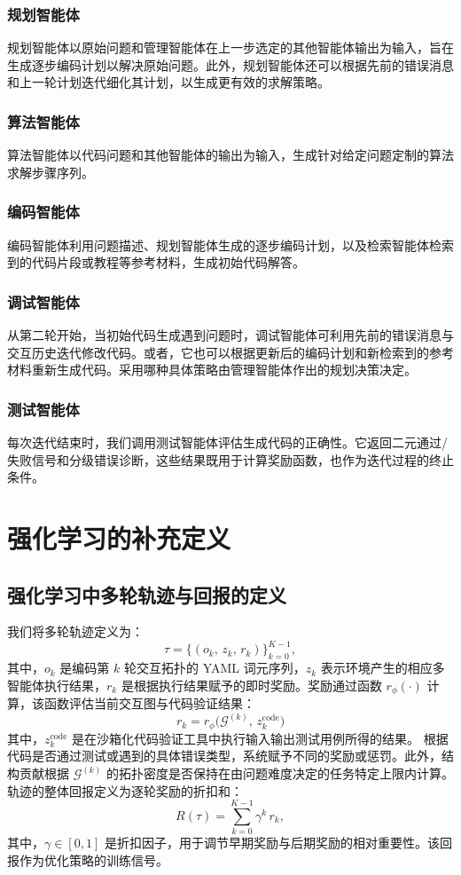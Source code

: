 \documentclass{article}
\theoremstyle{definition}
\begin{document}
\subsubsection{规划智能体}
规划智能体以原始问题和管理智能体在上一步选定的其他智能体输出为输入，旨在生成逐步编码计划以解决原始问题。此外，规划智能体还可以根据先前的错误消息和上一轮计划迭代细化其计划，以生成更有效的求解策略。
\subsubsection{算法智能体}
算法智能体以代码问题和其他智能体的输出为输入，生成针对给定问题定制的算法求解步骤序列。
\subsubsection{编码智能体}
编码智能体利用问题描述、规划智能体生成的逐步编码计划，以及检索智能体检索到的代码片段或教程等参考材料，生成初始代码解答。
\subsubsection{调试智能体}
从第二轮开始，当初始代码生成遇到问题时，调试智能体可利用先前的错误消息与交互历史迭代修改代码。或者，它也可以根据更新后的编码计划和新检索到的参考材料重新生成代码。采用哪种具体策略由管理智能体作出的规划决策决定。
\subsubsection{测试智能体}
每次迭代结束时，我们调用测试智能体评估生成代码的正确性。它返回二元通过/失败信号和分级错误诊断，这些结果既用于计算奖励函数，也作为迭代过程的终止条件。
\section{强化学习的补充定义}
\subsection{强化学习中多轮轨迹与回报的定义}
\label{appendix:Multi-Turn Trajectories}
我们将多轮轨迹定义为：
\begin{equation}\label{eq:traj}
\tau = \{(o_k,\, z_k,\, r_k)\}_{k=0}^{K-1},
\end{equation}
其中，$o_k$ 是编码第 $k$ 轮交互拓扑的 YAML 词元序列，$z_k$ 表示环境产生的相应多智能体执行结果，$r_k$ 是根据执行结果赋予的即时奖励。奖励通过函数 \(r_\phi(\cdot)\) 计算，该函数评估当前交互图与代码验证结果：
\begin{equation}\label{eq:reward}
r_k = r_\phi\!\big(\mathcal{G}^{(k)},\, z_k^{\text{code}}\big)
\end{equation}
其中，\(z_k^{\text{code}}\) 是在沙箱化代码验证工具中执行输入输出测试用例所得的结果。
根据代码是否通过测试或遇到的具体错误类型，系统赋予不同的奖励或惩罚。此外，结构贡献根据 $\mathcal{G}^{(k)}$ 的拓扑密度是否保持在由问题难度决定的任务特定上限内计算。
轨迹的整体回报定义为逐轮奖励的折扣和：
\begin{equation}\label{eq:return}
R(\tau) = \sum_{k=0}^{K-1} \gamma^k \, r_k,
\end{equation}
其中，\(\gamma \in [0,1]\) 是折扣因子，用于调节早期奖励与后期奖励的相对重要性。该回报作为优化策略的训练信号。
\end{document}
